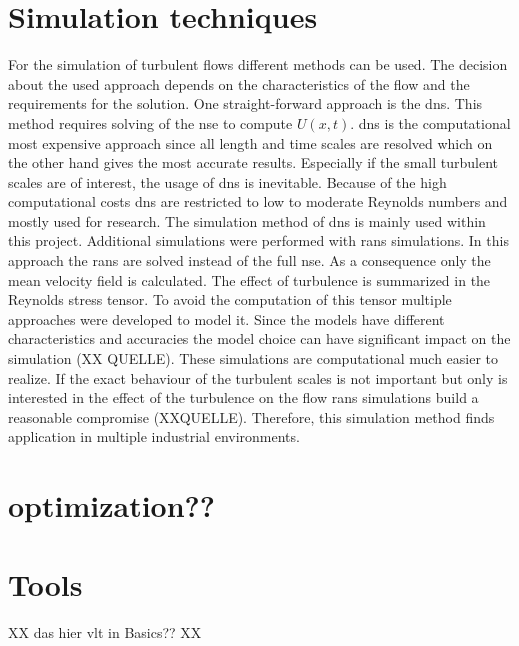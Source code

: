 \section{Simulation techniques} 
\label{sec:SimBasics}

For the simulation of turbulent flows different methods can be used. 
The decision about the used approach depends on the characteristics of the flow and the requirements for the solution.
One straight-forward approach is the \acrfull{dns}.
This method requires solving of the \acrshort{nse} to compute $U(x,t)$.
\acrshort{dns} is the computational most expensive approach since all length and time scales are resolved \citep{pope_turbulent_2015} which on the other hand gives the most accurate results.
Especially if the small turbulent scales are of interest, the usage of \acrshort{dns} is inevitable.
Because of the high computational costs \acrshort{dns} are restricted to low to moderate Reynolds numbers and mostly used for research.
The simulation method of \acrshort{dns} is mainly used within this project.
Additional simulations were performed with \acrfull{rans} simulations.
In this approach the \acrshort{rans} are solved instead of the full \acrshort{nse}.
As a consequence only the mean velocity field is calculated.
The effect of turbulence is summarized in the Reynolds stress tensor.
To avoid the computation of this tensor multiple approaches were developed to model it.
Since the models have different characteristics and accuracies the model choice can have significant impact on the simulation (XX QUELLE).
These simulations are computational much easier to realize.
If the exact behaviour of the turbulent scales is not important but only is interested in the effect of the turbulence on the flow \acrshort{rans} simulations build a reasonable compromise (XXQUELLE).
Therefore, this simulation method finds application in multiple industrial environments.


\section{optimization??}

\section{Tools}

XX das hier vlt in Basics?? XX

